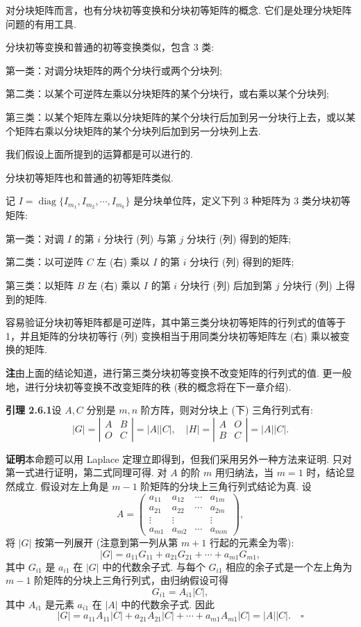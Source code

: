 \documentclass[UTF8, 12pt, fontset=fandol, oneside]{ctexart}
\begin{document}
对分块矩阵而言，也有分块初等变换和分块初等矩阵的概念. 它们是处理分块矩阵问题的有用工具.

分块初等变换和普通的初等变换类似，包含 3 类:

第一类：对调分块矩阵的两个分块行或两个分块列;

第二类：以某个可逆阵左乘以分块矩阵的某个分块行，或右乘以某个分块列;

第三类：以某个矩阵左乘以分块矩阵的某个分块行后加到另一分块行上去，或以某个矩阵右乘以分块矩阵的某个分块列后加到另一分块列上去.

我们假设上面所提到的运算都是可以进行的.

分块初等矩阵也和普通的初等矩阵类似.

记 $I=\operatorname{diag}\{I_{m_1},I_{m_2},\cdots,I_{m_k}\}$ 是分块单位阵，定义下列 3 种矩阵为 3 类分块初等矩阵:

第一类：对调 $I$ 的第 $i$ 分块行 (列) 与第 $j$ 分块行 (列) 得到的矩阵;

第二类：以可逆阵 $C$ 左 (右) 乘以 $I$ 的第 $i$ 分块行 (列) 得到的矩阵;

第三类：以矩阵 $B$ 左 (右) 乘以 $I$ 的第 $i$ 分块行 (列) 后加到第 $j$ 分块行 (列) 上得到的矩阵.

容易验证分块初等矩阵都是可逆阵，其中第三类分块初等矩阵的行列式的值等于 1，并且矩阵的分块初等行 (列) 变换相当于用同类分块初等矩阵左 (右) 乘以被变换的矩阵.

\noindent\textbf{注}\quad 由上面的结论知道，进行第三类分块初等变换不改变矩阵的行列式的值. 更一般地，进行分块初等变换不改变矩阵的秩 (秩的概念将在下一章介绍).

\noindent\textbf{引理 2.6.1}\quad 设 $A,C$ 分别是 $m,n$ 阶方阵，则对分块上 (下) 三角行列式有:
\[
|G|=\left|\begin{array}{cc}
A & B\\
O & C
\end{array}\right|=|A||C|,\quad
|H|=\left|\begin{array}{cc}
A & O\\
B & C
\end{array}\right|=|A||C|.
\]

\noindent\textbf{证明}\quad 本命题可以用 Laplace 定理立即得到，但我们采用另外一种方法来证明. 只对第一式进行证明，第二式同理可得. 对 $A$ 的阶 $m$ 用归纳法，当 $m=1$ 时，结论显然成立. 假设对左上角是 $m-1$ 阶矩阵的分块上三角行列式结论为真. 设
\[
A=\left(\begin{array}{cccc}
a_{11} & a_{12} & \cdots & a_{1m}\\
a_{21} & a_{22} & \cdots & a_{2m}\\
\vdots & \vdots & & \vdots\\
a_{m1} & a_{m2} & \cdots & a_{mm}
\end{array}\right),
\]
将 $|G|$ 按第一列展开 (注意到第一列从第 $m+1$ 行起的元素全为零):
\[
|G|=a_{11}G_{11}+a_{21}G_{21}+\cdots+a_{m1}G_{m1},
\]
其中 $G_{i1}$ 是 $a_{i1}$ 在 $|G|$ 中的代数余子式. 与每个 $G_{i1}$ 相应的余子式是一个左上角为 $m-1$ 阶矩阵的分块上三角行列式，由归纳假设可得
\[
G_{i1}=A_{i1}|C|,
\]
其中 $A_{i1}$ 是元素 $a_{i1}$ 在 $|A|$ 中的代数余子式. 因此
\[
|G|=a_{11}A_{11}|C|+a_{21}A_{21}|C|+\cdots+a_{m1}A_{m1}|C|=|A||C|. \quad \square
\]
\end{document}
